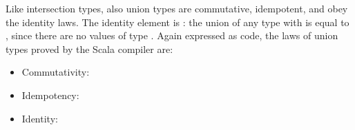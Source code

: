 Like intersection types, also union types are commutative, idempotent, and obey the identity laws. The identity element is : the union of any type  with  is equal to , since there are no values of type . Again expressed as code, the laws of union types proved by the Scala compiler are:
\begin{itemize}
    \item Commutativity: 
    \item Idempotency: 
    \item Identity: 
\end{itemize}
